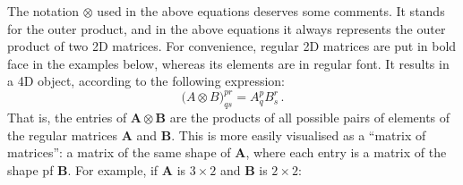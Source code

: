 \documentclass[a4paper,11pt]{article}
\begin{document}
The notation $\otimes$ used in the above equations deserves some comments.
It stands for the outer product, and in the above equations it always represents the outer product of two 2D matrices.
For convenience, regular 2D matrices are put in bold face in the examples below, whereas its elements are in regular font.
It results in a 4D object, according to the following expression:
\begin{equation}
  \big( A \otimes B \big)^{pr}_{qs} = A^p_q B^r_s\,.
\end{equation}
That is, the entries of $\mathbf{A} \otimes \mathbf{B}$ are the products of all possible pairs of elements of the regular matrices $\mathbf{A}$ and $\mathbf{B}$.
This is more easily visualised as a ``matrix of matrices'':
a matrix of the same shape of $\mathbf{A}$, where each entry is a matrix of the shape pf $\mathbf{B}$.
For example, if $\mathbf{A}$ is $3 \times 2$ and $\mathbf{B}$ is $2 \times 2$:
\end{document}
